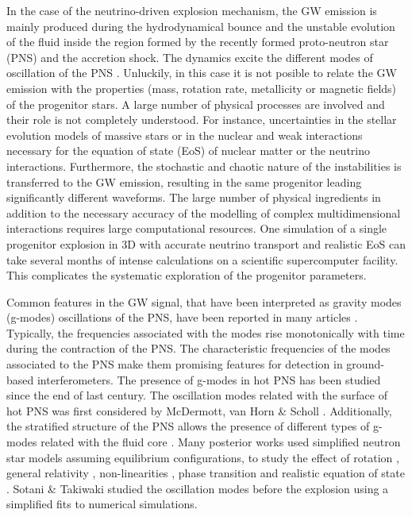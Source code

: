 In the case of the neutrino-driven explosion mechanism, the GW emission is mainly produced during the hydrodynamical bounce and the unstable evolution of the fluid inside the region formed by the recently formed proto-neutron star (PNS) and the accretion shock. The dynamics excite the different modes of oscillation of the PNS \cite{kokkotas, Friedman:2013}. Unluckily, in this case it is not posible to relate the GW emission with the properties (mass, rotation rate, metallicity or magnetic fields) of the progenitor stars.  A large number of physical processes are involved and their role is not completely understood. For instance,  uncertainties in the stellar evolution models of massive stars or in the nuclear and weak interactions necessary for the equation of state (EoS) of nuclear matter or the neutrino interactions. Furthermore, the stochastic and chaotic nature of the instabilities is transferred to the GW emission, resulting in the same progenitor leading significantly different waveforms.
The large number of physical ingredients in addition to the necessary accuracy of the modelling of complex multidimensional interactions requires large computational resources. One simulation of a single progenitor explosion  in 3D with accurate neutrino transport and realistic EoS can take several months of intense calculations on a scientific supercomputer facility. This complicates the systematic exploration of the progenitor parameters.

Common features in the GW signal, that have been interpreted as gravity modes (g-modes) oscillations of the PNS, have been reported in many articles \cite{murphy:09, Cerda:2013, mueller:13gw, Yakunin:2015, Kuroda:2016, Andresen:2017}. Typically, the frequencies associated with the modes rise monotonically with time during the contraction of the PNS. The characteristic frequencies of the modes associated to the PNS make them promising features for detection in ground-based interferometers. The presence of g-modes in hot PNS has been studied since the end of last century. The oscillation modes related with the surface of hot PNS was first considered by McDermott, van Horn \& Scholl \cite{McDermott:1983}. Additionally, the stratified structure of the PNS allows the presence of different types of g-modes related with the fluid core \cite{Reisenegger:1992}. Many posterior works used simplified neutron star models  assuming equilibrium configurations, to study the effect of rotation \cite{Ferrari:2004}, general relativity \cite{Passamonti:2005}, non-linearities \cite{Dimmelmeier:2006}, phase transition \cite{Kruger:2015} and realistic equation of state \cite{Camelio:2017}. Sotani \& Takiwaki \cite{Sotani:2016} studied the oscillation modes before the explosion using a simplified fits to numerical simulations.

